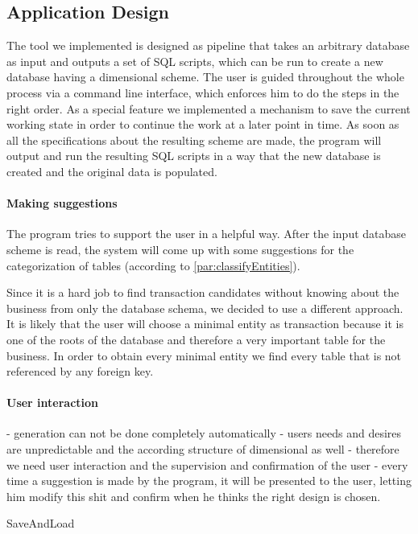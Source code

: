 \subsection{Application Design}

The tool we implemented is designed as pipeline that takes an arbitrary database as input and outputs a set of SQL scripts, which can be run to create a new database having a dimensional scheme.
The user is guided throughout the whole process via a command line interface, which enforces him to do the steps in the right order.
As a special feature we implemented a mechanism to save the current working state in order to continue the work at a later point in time.
As soon as all the specifications about the resulting scheme are made, the program will output and run the resulting SQL scripts in a way that the new database is created and the original data is populated.

\paragraph{Making suggestions}

The program tries to support the user in a helpful way.
After the input database scheme is read, the system will come up with some suggestions for the categorization of tables (according to \ref{par:classifyEntities}).

Since it is a hard job to find transaction candidates without knowing about the business from only the database schema, we decided to use a different approach.
It is likely that the user will choose a minimal entity as transaction because it is one of the roots of the database and therefore a very important table for the business.
In order to obtain every minimal entity we find every table that is not referenced by any foreign key.


\paragraph{User interaction}

- generation can not be done completely automatically
- users needs and desires are unpredictable and the according structure of dimensional as well
- therefore we need user interaction and the supervision and confirmation of the user
- every time a suggestion is made by the program, it will be presented to the user, letting him modify this shit and confirm when he thinks the right design is chosen.

SaveAndLoad

